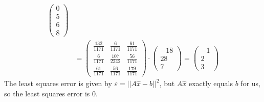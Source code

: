 \documentclass{article}
\begin{document}
\begin{align*}
\begin{pmatrix}
        0\\
        5\\
        6\\
        8
    \end{pmatrix} \\
    &= \begin{pmatrix}
        \frac{132}{1171} & \frac{6}{1171} & \frac{61}{1171}\\
        \frac{6}{1171} & \frac{107}{2342} & \frac{56}{1171}\\
        \frac{61}{1171} & \frac{56}{1171}& \frac{179}{1171}
    \end{pmatrix}\cdot \begin{pmatrix}
        -18\\
        28\\
        7
    \end{pmatrix} = \begin{pmatrix}
        -1\\
        2\\
        3
    \end{pmatrix}
\end{align*}
The least squares error is given by $\varepsilon = ||A\hat{x}- b||^2$, but $A\hat{x}$ exactly equals $b$ for us, so the least squares error is 0. 
\end{document}
